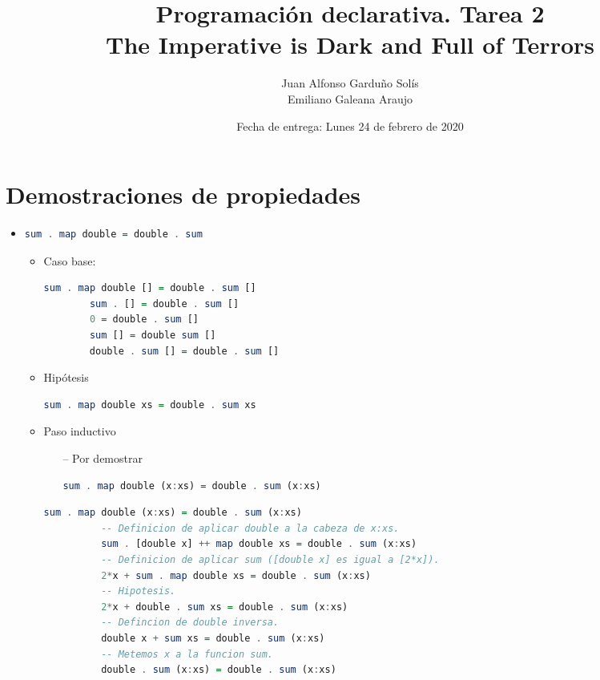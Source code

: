 \documentclass[spanish,12pt,letterpaper]{article}
\title{Programación declarativa. Tarea 2\\
  \Huge{The Imperative is Dark and Full of Terrors}}
\author{Juan Alfonso Garduño Solís\\
  Emiliano Galeana Araujo}
\affil{Facultad de ciencias, UNAM}
\date{Fecha de entrega: Lunes 24 de febrero de 2020}
\begin{document}
\maketitle

\section{Demostraciones de propiedades}
\begin{itemize}
\item
  \begin{lstlisting}[language=Haskell]
    sum . map double = double . sum\end{lstlisting}
    \begin{itemize}
    \item Caso base:
      \begin{lstlisting}[language=Haskell]
        sum . map double [] = double . sum []
        sum . [] = double . sum []
        0 = double . sum []
        sum [] = double sum []
        double . sum [] = double . sum []\end{lstlisting}
    \item Hipótesis
      \begin{lstlisting}[language=Haskell]
        sum . map double xs = double . sum xs\end{lstlisting}
      \item Paso inductivo
        \begin{itemize}
        \item [--] Por demostrar
          \begin{lstlisting}[language=Haskell]
            sum . map double (x:xs) = double . sum (x:xs)\end{lstlisting}
        \end{itemize}
        \begin{lstlisting}[language=Haskell]
          sum . map double (x:xs) = double . sum (x:xs)
          -- Definicion de aplicar double a la cabeza de x:xs.
          sum . [double x] ++ map double xs = double . sum (x:xs)
          -- Definicion de aplicar sum ([double x] es igual a [2*x]).
          2*x + sum . map double xs = double . sum (x:xs)
          -- Hipotesis.
          2*x + double . sum xs = double . sum (x:xs)
          -- Defincion de double inversa.
          double x + sum xs = double . sum (x:xs)
          -- Metemos x a la funcion sum.
          double . sum (x:xs) = double . sum (x:xs) \end{lstlisting}
    \end{itemize}


\end{itemize}
\end{document}
